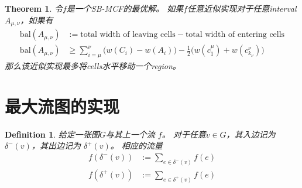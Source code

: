 \documentclass[UTF8,a4paper]{ctexart}
\newcommand{\bal}{\text{bal}}
\newtheorem{theorem}{Theorem}
\newtheorem{definition}{Definition}
\begin{document}
\begin{theorem}
    令$f$是一个SB-MCF的最优解。
    如果$f$任意近似实现对于任意interval $A_{\mu,\nu}$，如果有
    \begin{align*}
        \bal(A_{\mu,\nu}) &:=\text{total width of leaving cells} - \text{total width of entering cells}\\
        \bal(A_{\mu,\nu}) &\geq \sum_{i=\mu}^{\nu}\bigl(%
            w(C_i)-w(A_i)%
        \bigr)%
        -\frac{1}{2}\bigl(%
            w(c^{\mu}_1)+w(c^{\nu}_{k_\nu})
        \bigr)%
    \end{align*}
    那么该近似实现最多将cells水平移动一个region。
\end{theorem}

\section{最大流图的实现}

\begin{definition}
    给定一张图$G$与其上一个流 $f$。
    对于任意$v\in G$，其入边记为 $\delta^-(v)$，其出边记为 $\delta^+(v)$。
    相应的流量
    \begin{align*}
        f(\delta^-(v)) &:=\sum_{e\in\delta^-(v)}f(e)\\
        f(\delta^+(v)) &:=\sum_{e\in\delta^+(v)}f(e)
    \end{align*}
\end{definition}
\end{document}
